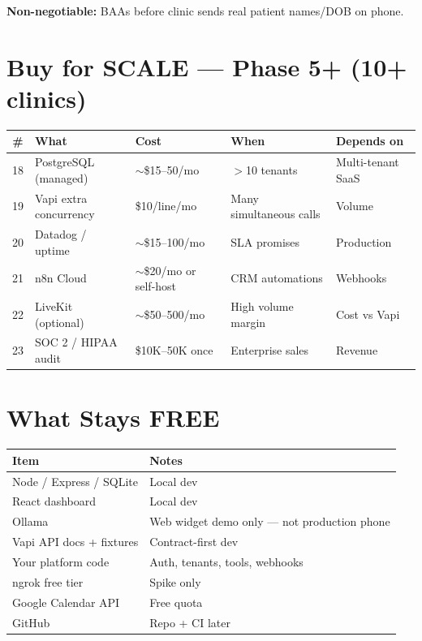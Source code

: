 \documentclass[11pt,a4paper]{article}
\begin{document}
\textbf{Non-negotiable:} BAAs before clinic sends real patient names/DOB on phone.

\section{Buy for SCALE --- Phase 5+ (10+ clinics)}

\begin{center}
\scriptsize
\begin{tabular}{@{}cllll@{}}
\toprule
\textbf{\#} & \textbf{What} & \textbf{Cost} & \textbf{When} & \textbf{Depends on} \\
\midrule
18 & PostgreSQL (managed) & $\sim$\$15--50/mo & $>$10 tenants & Multi-tenant SaaS \\
19 & Vapi extra concurrency & \$10/line/mo & Many simultaneous calls & Volume \\
20 & Datadog / uptime & $\sim$\$15--100/mo & SLA promises & Production \\
21 & n8n Cloud & $\sim$\$20/mo or self-host & CRM automations & Webhooks \\
22 & LiveKit (optional) & $\sim$\$50--500/mo & High volume margin & Cost vs Vapi \\
23 & SOC 2 / HIPAA audit & \$10K--50K once & Enterprise sales & Revenue \\
\bottomrule
\end{tabular}
\end{center}

\section{What Stays FREE}

\begin{center}
\small
\begin{tabular}{@{}ll@{}}
\toprule
\textbf{Item} & \textbf{Notes} \\
\midrule
Node / Express / SQLite & Local dev \\
React dashboard & Local dev \\
Ollama & Web widget demo only --- not production phone \\
Vapi API docs + fixtures & Contract-first dev \\
Your platform code & Auth, tenants, tools, webhooks \\
ngrok free tier & Spike only \\
Google Calendar API & Free quota \\
GitHub & Repo + CI later \\
\bottomrule
\end{tabular}
\end{center}
\end{document}
